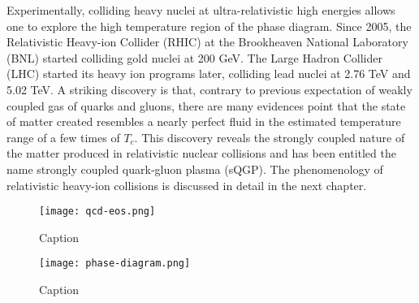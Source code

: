 Experimentally, colliding heavy nuclei at ultra-relativistic high energies allows one to explore the high temperature region of the phase diagram.
Since 2005, the Relativistic Heavy-ion Collider (RHIC) at the Brookheaven National Laboratory (BNL) started colliding gold nuclei at 200 GeV. 
The Large Hadron Collider (LHC) started its heavy ion programs later, colliding lead nuclei at 2.76 TeV and 5.02 TeV.
A striking discovery is that, contrary to previous expectation of weakly coupled gas of quarks and gluons, there are many evidences point that the state of matter created resembles a nearly perfect fluid in the estimated temperature range of a few times of $T_c$.
This discovery reveals the strongly coupled nature of the matter produced in relativistic nuclear collisions and has been entitled the name strongly coupled quark-gluon plasma (sQGP).
The phenomenology of relativistic heavy-ion collisions is discussed in detail in the next chapter.

\begin{figure}
    \centering
    \texttt{[image: qcd-eos.png]}
    \caption{Caption}
    \label{fig:qcd_eos}
\end{figure}

\begin{figure}
    \centering
    \texttt{[image: phase-diagram.png]}
    \caption{Caption}
    \label{fig:phase-diagram}
\end{figure}
